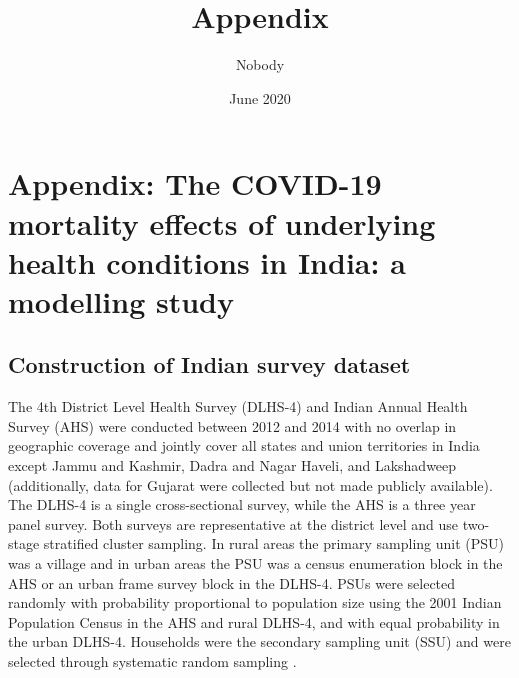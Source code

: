 \documentclass[10pt,letterpaper]{article}
\title{Appendix} \author{Nobody}
\numberwithin{equation}{section}
\begin{document}
\date{June 2020}
\section{Appendix: The COVID-19 mortality effects of underlying health conditions in India: a modelling study}

\subsection{Construction of Indian survey dataset}
The 4th District Level Health Survey (DLHS-4) and Indian Annual Health Survey (AHS) were conducted between 2012 and 2014 with no overlap in geographic coverage and jointly cover all states and union territories in India except Jammu and Kashmir, Dadra and Nagar Haveli, and Lakshadweep (additionally, data for Gujarat were collected but not made publicly available). The DLHS-4 is a single cross-sectional survey, while the AHS is a three year panel survey. Both surveys are representative at the district level and use two-stage stratified cluster sampling. In rural areas the primary sampling unit (PSU) was a village and in urban areas the PSU was a census enumeration block in the AHS or an urban frame survey block in the DLHS-4. PSUs were selected randomly with probability proportional to population size using the 2001 Indian Population Census in the AHS and rural DLHS-4, and with equal probability in the urban DLHS-4. Households were the secondary sampling unit (SSU) and were selected through systematic random sampling \cite{noauthor_annual_2014-1}.
\end{document}
